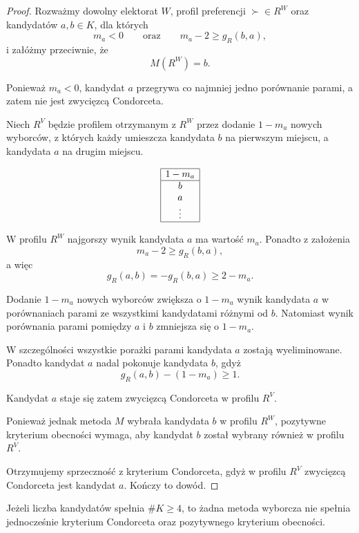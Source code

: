 \documentclass[12pt,a4paper]{mwrep}
\begin{document}
	\begin{proof}
		Rozważmy dowolny elektorat \(W\), profil preferencji \(\succ \in R^W\) oraz kandydatów \(a,b \in K\), dla których
		\[
		m_a < 0
		\qquad \text{oraz} \qquad
		m_a - 2 \geq g_R(b,a),
		\]
		i załóżmy przeciwnie, że
		\[
		M(R^{W}) = b.
		\]
		
		Ponieważ \(m_a < 0\), kandydat \(a\) przegrywa co najmniej jedno porównanie parami, a zatem nie jest zwycięzcą Condorceta.
		
		Niech \(R^{V}\) będzie profilem otrzymanym z \(R^W\) przez dodanie \(1-m_a\) nowych wyborców, z których każdy umieszcza kandydata \(b\) na pierwszym miejscu, a kandydata \(a\) na drugim miejscu.
		
		\[
		\begin{array}{|c|}\hline
			1-m_a\\\hline
			b\\
			a\\
			\vdots
			\\\hline
		\end{array}
		\]
		
		W profilu \(R^W\) najgorszy wynik kandydata \(a\) ma wartość \(m_a\). Ponadto z założenia
		\[
		m_a - 2 \geq g_R(b,a),
		\]
		a więc
		\[
		g_R(a,b) = -g_R(b,a) \geq 2 - m_a.
		\]
		
		Dodanie \(1-m_a\) nowych wyborców zwiększa o \(1-m_a\) wynik kandydata \(a\) w porównaniach parami ze wszystkimi kandydatami różnymi od \(b\). Natomiast wynik porównania parami pomiędzy \(a\) i \(b\) zmniejsza się o \(1-m_a\).
		
		W szczególności wszystkie porażki parami kandydata \(a\) zostają wyeliminowane. Ponadto kandydat \(a\) nadal pokonuje kandydata \(b\), gdyż
		\[
		g_R(a,b) - (1-m_a) \geq 1.
		\]
		
		Kandydat \(a\) staje się zatem zwycięzcą Condorceta w profilu \(R^{V}\).
		
		Ponieważ jednak metoda \(M\) wybrała kandydata \(b\) w profilu \(R^W\), pozytywne kryterium obecności wymaga, aby kandydat \(b\) został wybrany również w profilu \(R^{V}\).
		
		Otrzymujemy sprzeczność z kryterium Condorceta, gdyż w profilu \(R^{V}\) zwycięzcą Condorceta jest kandydat \(a\). Kończy to dowód.
	\end{proof}
	
	\begin{theorem}
		Jeżeli liczba kandydatów spełnia \(\#K \geq 4\), to żadna metoda wyborcza nie spełnia jednocześnie kryterium Condorceta oraz pozytywnego kryterium obecności.
	\end{theorem}
	
\end{document}
